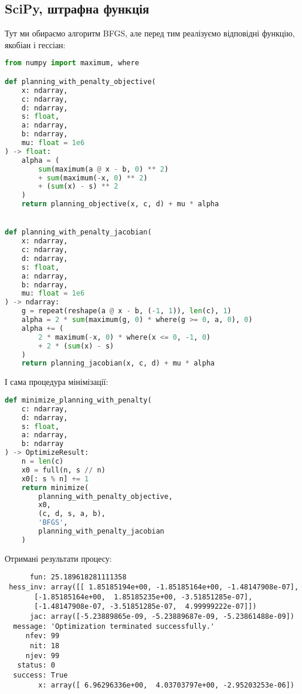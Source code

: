 \documentclass[12pt]{report}
\begin{document}
    \subsection*{SciPy, штрафна функція}\label{subsec:scipy-penalty-objective}

    Тут ми обираємо алгоритм BFGS, але перед тим реалізуємо відповідні функцію, якобіан і гессіан:

    \begin{lstlisting}[language=Python,label={lst:scipy-penalty-objective-1}]
from numpy import maximum, where

def planning_with_penalty_objective(
    x: ndarray,
    c: ndarray,
    d: ndarray,
    s: float,
    a: ndarray,
    b: ndarray,
    mu: float = 1e6
) -> float:
    alpha = (
        sum(maximum(a @ x - b, 0) ** 2)
        + sum(maximum(-x, 0) ** 2)
        + (sum(x) - s) ** 2
    )
    return planning_objective(x, c, d) + mu * alpha


def planning_with_penalty_jacobian(
    x: ndarray,
    c: ndarray,
    d: ndarray,
    s: float,
    a: ndarray,
    b: ndarray,
    mu: float = 1e6
) -> ndarray:
    g = repeat(reshape(a @ x - b, (-1, 1)), len(c), 1)
    alpha = 2 * sum(maximum(g, 0) * where(g >= 0, a, 0), 0)
    alpha += (
        2 * maximum(-x, 0) * where(x <= 0, -1, 0)
        + 2 * (sum(x) - s)
    )
    return planning_jacobian(x, c, d) + mu * alpha
    \end{lstlisting}

    І сама процедура мінімізації:

    \begin{lstlisting}[language=Python,label={lst:scipy-penalty-objective-2}]
def minimize_planning_with_penalty(
    c: ndarray,
    d: ndarray,
    s: float,
    a: ndarray,
    b: ndarray
) -> OptimizeResult:
    n = len(c)
    x0 = full(n, s // n)
    x0[: s % n] += 1
    return minimize(
        planning_with_penalty_objective,
        x0,
        (c, d, s, a, b),
        'BFGS',
        planning_with_penalty_jacobian
    )
    \end{lstlisting}

    Отримані результати процесу:

    \begin{verbatim}
      fun: 25.189618281111358
 hess_inv: array([[ 1.85185194e+00, -1.85185164e+00, -1.48147908e-07],
       [-1.85185164e+00,  1.85185235e+00, -3.51851285e-07],
       [-1.48147908e-07, -3.51851285e-07,  4.99999222e-07]])
      jac: array([-5.23889865e-09, -5.23889687e-09, -5.23861488e-09])
  message: 'Optimization terminated successfully.'
     nfev: 99
      nit: 18
     njev: 99
   status: 0
  success: True
        x: array([ 6.96296336e+00,  4.03703797e+00, -2.95203253e-06])
    \end{verbatim}
\end{document}
